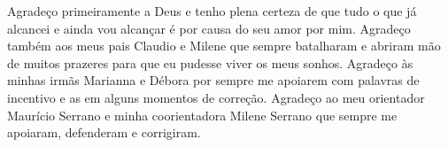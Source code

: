 \begin{agradecimentos}

Agradeço primeiramente a Deus e tenho plena certeza de que tudo o que já alcancei e ainda vou alcançar é por causa do seu amor por mim. Agradeço também aos meus pais Claudio e Milene que sempre batalharam e abriram mão de muitos prazeres para que eu pudesse viver os meus sonhos. Agradeço às minhas irmãs Marianna e Débora por sempre me apoiarem com palavras de incentivo e as em alguns momentos de correção. Agradeço ao meu orientador Maurício Serrano e minha coorientadora Milene Serrano que sempre me apoiaram, defenderam e corrigiram. 

\end{agradecimentos}

